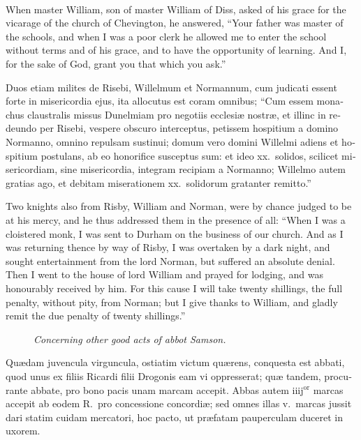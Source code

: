 \documentclass{book}
\newcounter{engnote}
\newcommand{\engnotenum}{\textsuperscript{\arabic{engnote}\stepcounter{engnote}}}
\newcommand{\blockhead}[4][]{
\begin{figure}
\centering
\vspace{#4}
\parbox{2.75cm}{\begin{center}\footnotesize \color{BrickRed} \emph{#2}\\ #1 \end{center}}
\end{figure}
}
\begin{document}
\begin{paracol}{2}
\switchcolumn

When master William, son of master William of Diss,\engnotenum{} asked of his grace for the vicarage of the church of Chevington, he answered, ``Your father was master of the schools, and when I was a poor clerk he allowed me to enter the school without terms and of his grace, and to have the opportunity of learning. And I, for the sake of God, grant you that which you ask.''

\switchcolumn*

\begin{otherlanguage}{latin}
Duos etiam milites de Risebi, Willelmum et Normannum, cum judicati essent forte in misericordia ejus, ita allocutus est coram omnibus; ``Cum essem monachus claustralis missus Dunelmiam pro negotiis ecclesi\ae{} nostr\ae{}, et illinc in redeundo per Risebi, vespere obscuro interceptus, petissem hospitium a domino Normanno, omnino repulsam sustinui; domum vero domini Willelmi adiens et hospitium postulans, ab eo honorifice susceptus sum: et ideo xx.\ solidos, scilicet misericordiam, sine misericordia, integram recipiam a Normanno; Willelmo autem gratias ago, et debitam miserationem xx.\ solidorum gratanter remitto.''
\end{otherlanguage}

\switchcolumn

Two knights also from Risby, William and Norman, were by chance judged to be at his mercy, and he thus addressed them in the presence of all: ``When I was a cloistered monk, I was sent to Durham on the business of our church. And as I was returning thence by way of Risby, I was overtaken by a dark night, and sought entertainment from the lord Norman, but suffered an absolute denial. Then I went to the house of lord William and prayed for lodging, and was honourably received by him. For this cause I will take twenty shillings, the full penalty, without pity, from Norman; but I give thanks to William, and gladly remit the due penalty of twenty shillings.''

\clearpage

\switchcolumn*

\begin{otherlanguage}{latin}
\blockhead{Concerning other good acts of abbot Samson.}{3}{-0.1cm}
Qu\ae{}dam juvencula virguncula, ostiatim victum qu\ae{}rens, conquesta est abbati, quod unus ex filiis Ricardi filii Drogonis eam vi oppresserat; qu\ae{} tandem, procurante abbate, pro bono pacis unam marcam accepit. Abbas autem iiij$^\text{or}$ marcas accepit ab eodem R.\ pro concessione concordi\ae{}; sed omnes illas v.\ marcas jussit dari statim cuidam mercatori, hoc pacto, ut pr\ae{}fatam pauperculam duceret in uxorem.


\end{otherlanguage}
\end{paracol}
\end{document}
